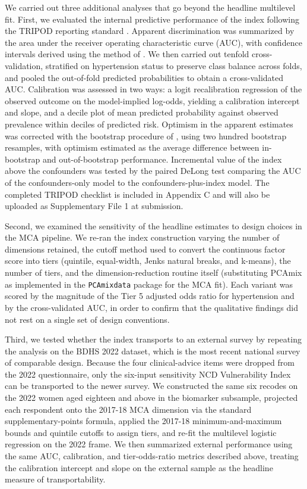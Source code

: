 \documentclass[
  12pt,
  a4paper]{article}
\begin{document}
We carried out three additional analyses that go beyond the headline multilevel fit. First, we evaluated the internal predictive performance of the index following the TRIPOD reporting standard \citep{moons_tripod_2015}. Apparent discrimination was summarized by the area under the receiver operating characteristic curve (AUC), with confidence intervals derived using the method of \citet{delong_areas_1988}. We then carried out tenfold cross-validation, stratified on hypertension status to preserve class balance across folds, and pooled the out-of-fold predicted probabilities to obtain a cross-validated AUC. Calibration was assessed in two ways: a logit recalibration regression of the observed outcome on the model-implied log-odds, yielding a calibration intercept and slope, and a decile plot of mean predicted probability against observed prevalence within deciles of predicted risk. Optimism in the apparent estimates was corrected with the bootstrap procedure of \citet{harrell_regression_2015}, using two hundred bootstrap resamples, with optimism estimated as the average difference between in-bootstrap and out-of-bootstrap performance. Incremental value of the index above the confounders was tested by the paired DeLong test comparing the AUC of the confounders-only model to the confounders-plus-index model. The completed TRIPOD checklist is included in Appendix C and will also be uploaded as Supplementary File 1 at submission.

Second, we examined the sensitivity of the headline estimates to design choices in the MCA pipeline. We re-ran the index construction varying the number of dimensions retained, the cutoff method used to convert the continuous factor score into tiers (quintile, equal-width, Jenks natural breaks, and k-means), the number of tiers, and the dimension-reduction routine itself (substituting PCAmix as implemented in the \texttt{PCAmixdata} package for the MCA fit). Each variant was scored by the magnitude of the Tier 5 adjusted odds ratio for hypertension and by the cross-validated AUC, in order to confirm that the qualitative findings did not rest on a single set of design conventions.

Third, we tested whether the index transports to an external survey by repeating the analysis on the BDHS 2022 dataset, which is the most recent national survey of comparable design. Because the four clinical-advice items were dropped from the 2022 questionnaire, only the six-input sensitivity NCD Vulnerability Index can be transported to the newer survey. We constructed the same six recodes on the 2022 women aged eighteen and above in the biomarker subsample, projected each respondent onto the 2017-18 MCA dimension via the standard supplementary-points formula, applied the 2017-18 minimum-and-maximum bounds and quintile cutoffs to assign tiers, and re-fit the multilevel logistic regression on the 2022 frame. We then summarized external performance using the same AUC, calibration, and tier-odds-ratio metrics described above, treating the calibration intercept and slope on the external sample as the headline measure of transportability.
\end{document}
